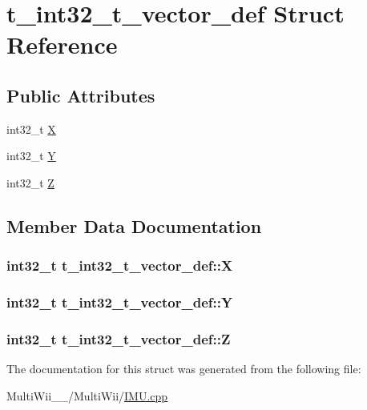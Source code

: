 \hypertarget{structt__int32__t__vector__def}{\section{t\-\_\-int32\-\_\-t\-\_\-vector\-\_\-def Struct Reference}
\label{structt__int32__t__vector__def}
}
\subsection*{Public Attributes}
\begin{DoxyCompactItemize}
\item 
int32\-\_\-t \hyperlink{structt__int32__t__vector__def_a0120584fd5ae705e11c98dceb33070c1}{X}
\item 
int32\-\_\-t \hyperlink{structt__int32__t__vector__def_a754ea2343c885431be1b74b6fe14bb7c}{Y}
\item 
int32\-\_\-t \hyperlink{structt__int32__t__vector__def_a6e4a7c7ece77a08e1c6aa83b3ec2b1ce}{Z}
\end{DoxyCompactItemize}


\subsection{Member Data Documentation}
\hypertarget{structt__int32__t__vector__def_a0120584fd5ae705e11c98dceb33070c1}{
\subsubsection[{X}]{\setlength{\rightskip}{0pt plus 5cm}int32\-\_\-t t\-\_\-int32\-\_\-t\-\_\-vector\-\_\-def\-::\-X}}\label{structt__int32__t__vector__def_a0120584fd5ae705e11c98dceb33070c1}
\hypertarget{structt__int32__t__vector__def_a754ea2343c885431be1b74b6fe14bb7c}{
\subsubsection[{Y}]{\setlength{\rightskip}{0pt plus 5cm}int32\-\_\-t t\-\_\-int32\-\_\-t\-\_\-vector\-\_\-def\-::\-Y}}\label{structt__int32__t__vector__def_a754ea2343c885431be1b74b6fe14bb7c}
\hypertarget{structt__int32__t__vector__def_a6e4a7c7ece77a08e1c6aa83b3ec2b1ce}{
\subsubsection[{Z}]{\setlength{\rightskip}{0pt plus 5cm}int32\-\_\-t t\-\_\-int32\-\_\-t\-\_\-vector\-\_\-def\-::\-Z}}\label{structt__int32__t__vector__def_a6e4a7c7ece77a08e1c6aa83b3ec2b1ce}


The documentation for this struct was generated from the following file\-:\begin{DoxyCompactItemize}
\item 
Multi\-Wii\-\_\-\_/\-Multi\-Wii/\hyperlink{IMU_8cpp}{I\-M\-U.\-cpp}\end{DoxyCompactItemize}
